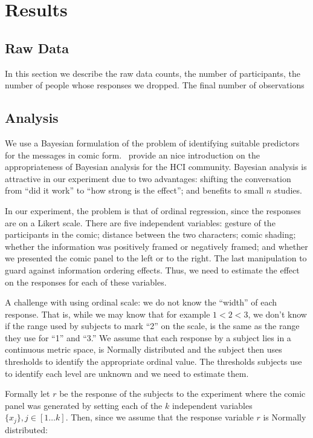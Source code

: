 
\section{Results}
\label{sec:Results}

\subsection{Raw Data}
\label{sub:Raw Data}
In this section we describe the raw data counts, the number of participants, the number of people whose responses we dropped. The final number of observations

\subsection{Analysis}
\label{sub:Analysis}
We use a Bayesian formulation of the problem of identifying suitable predictors for the messages in comic form.~\textcite{Kay2016} provide an nice introduction on the appropriateness of Bayesian analysis for the HCI community. Bayesian analysis is attractive in our experiment due to two advantages: shifting the conversation from ``did it work'' to ``how strong is the effect''; and benefits to small $n$ studies.

In our experiment, the problem is that of ordinal regression, since the responses are on a Likert scale. There are five independent variables: gesture of the participants in the comic;  distance between the two characters; comic shading; whether the information was positively framed or negatively framed; and whether we presented the comic panel to the left or to the right. The last manipulation to guard against information ordering effects. Thus, we need to estimate the effect on the responses for each of these variables.

A challenge with using ordinal scale: we do not know the ``width'' of each response. That is, while we may know that for example $1<2<3$, we don't know if the range used by subjects to mark ``2'' on the scale, is the same as the range they use for ``1'' and ``3.''  We assume that each response by a subject lies in a continuous metric space, is Normally distributed and the subject then uses thresholds to identify the appropriate ordinal value. The thresholds subjects use to identify each level are unknown and we need to estimate them.


Formally let $r$ be the response of the subjects to the experiment where the comic panel was generated by setting each of the $k$ independent variables $\{x_j\}, j \in [1 \ldots k]$. Then, since we assume that the response variable $r$ is Normally distributed:

